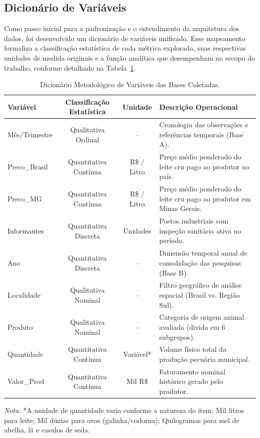 \documentclass[12pt,a4paper]{article}
\begin{document}
\subsection{Dicionário de Variáveis}

Como passo inicial para a padronização e o entendimento da arquitetura dos dados, foi desenvolvido um dicionário de variáveis unificado. Esse mapeamento formaliza a classificação estatística de cada métrica explorada, suas respectivas unidades de medida originais e a função analítica que desempenham no escopo do trabalho, conforme detalhado na Tabela~\ref{tab:dicionario_variaveis}.

\begin{table}[htbp]
\centering
\caption{Dicionário Metodológico de Variáveis das Bases Coletadas.}
\label{tab:dicionario_variaveis}
\small %
\begin{tabularx}{\textwidth}{l c c X}
\toprule
\textbf{Variável} & \textbf{Classificação Estatística} & \textbf{Unidade} & \textbf{Descrição Operacional} \\
\midrule
Mês/Trimestre & Qualitativa Ordinal    & --          & Cronologia das observações e referências temporais (Base A). \\
Preco\_Brasil & Quantitativa Contínua  & R\$ / Litro & Preço médio ponderado do leite cru pago ao produtor no país. \\
Preco\_MG     & Quantitativa Contínua  & R\$ / Litro & Preço médio ponderado do leite cru pago ao produtor em Minas Gerais. \\
Informantes   & Quantitativa Discreta  & Unidades    & Postos industriais com inspeção sanitária ativa no período. \\
Ano           & Quantitativa Discreta  & --          & Dimensão temporal anual de consolidação das pesquisas (Base B). \\
Localidade    & Qualitativa Nominal   & --          & Filtro geográfico de análise espacial (Brasil vs. Região Sul). \\
Produto       & Qualitativa Nominal   & --          & Categoria de origem animal avaliada (divida em 6 subgrupos). \\
Quantidade    & Quantitativa Contínua  & Variável* & Volume físico total da produção pecuária municipal. \\
Valor\_Prod   & Quantitativa Contínua  & Mil R\$     & Faturamento nominal histórico gerado pelo produtor. \\
\bottomrule
\end{tabularx}
\begin{flushleft}
\footnotesize
\textit{Nota:} *A unidade de quantidade varia conforme a natureza do item: Mil litros para leite; Mil dúzias para ovos (galinha/codorna); Quilogramas para mel de abelha, lã e casulos de seda.
\end{flushleft}
\end{table}
\end{document}
